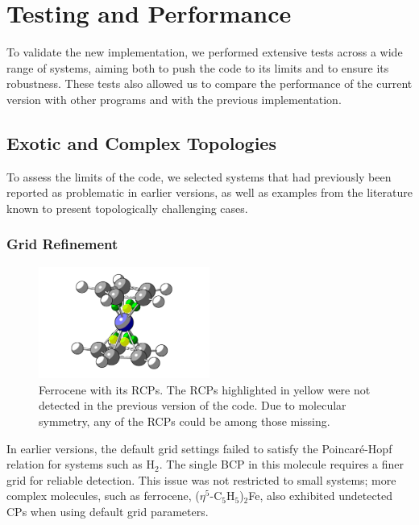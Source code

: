 \newpage
\section{Testing and Performance}

To validate the new implementation, we performed extensive tests across a wide
range of systems, aiming both to push the code to its limits and to ensure its
robustness. These tests also allowed us to compare the performance of the
current version with other programs and with the previous
implementation.

\subsection{Exotic and Complex Topologies}

To assess the limits of the code, we selected systems that had previously been
reported as problematic in earlier versions, as well as examples from the
literature known to present topologically challenging cases.

\subsubsection{Grid Refinement}

\begin{figure}
  \centering
  \includegraphics[width=0.5\textwidth]{img/ferrocene_cp_cartoon.png}
  \caption{Ferrocene with its \glspl{RCP}. The \glspl{RCP} highlighted in yellow were not
           detected in the previous version of the code. Due to molecular
           symmetry, any of the \glspl{RCP} could be among those missing.}
  \label{img_ferrocene}
\end{figure}

In earlier versions, the default grid settings failed to satisfy the
Poincaré-Hopf relation for systems such as H$_2$. The single
\gls{BCP} in this molecule requires a finer grid for reliable detection. This
issue was not restricted to small systems; more complex molecules, such as
ferrocene, ($\eta^5$-C$_5$H$_5$)$_2$Fe, also exhibited undetected
\glspl{CP} when using default grid parameters.

